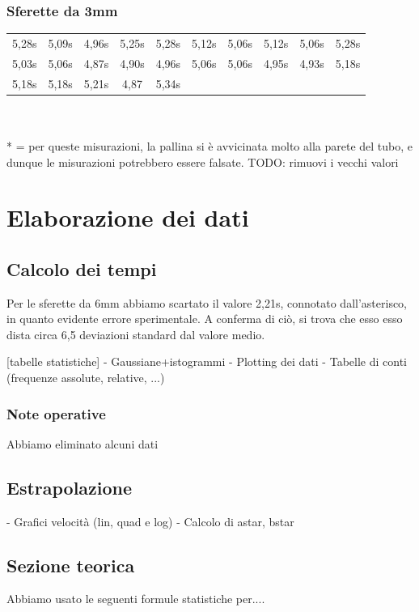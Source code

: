 \documentclass[a4paper,10pt]{report}
\begin{document}
\subsubsection{Sferette da 3mm}
\begin{tabular}{|c|c|c|c|c|c|c|c|c|c|}
\toprule
 5,28s & 5,09s & 4,96s & 5,25s & 5,28s & 5,12s & 5,06s & 5,12s & 5,06s & 5,28s \\
 5,03s & 5,06s & 4,87s & 4,90s & 4,96s & 5,06s & 5,06s & 4,95s & 4,93s & 5,18s \\
 5,18s & 5,18s & 5,21s & 4,87 & 5,34s &  &  &  &  & \\
\bottomrule
\end{tabular}
\\
\\
* = per queste misurazioni, la pallina si è avvicinata molto alla parete del tubo, e dunque le misurazioni potrebbero essere falsate.
TODO: rimuovi i vecchi valori

\section{Elaborazione dei dati}
\subsection{Calcolo dei tempi}
Per le sferette da 6mm abbiamo scartato il valore 2,21s, connotato dall'asterisco, in quanto evidente errore sperimentale. A conferma di ciò, si trova che esso esso dista circa 6,5 deviazioni standard dal valore medio.

[tabelle statistiche]
- Gaussiane+istogrammi
- Plotting dei dati
- Tabelle di conti (frequenze assolute, relative, ...)

\subsubsection{Note operative}
Abbiamo eliminato alcuni dati

\subsection{Estrapolazione}
- Grafici velocità (lin, quad e log)
- Calcolo di astar, bstar

\subsection{Sezione teorica}
Abbiamo usato le seguenti formule statistiche per....
\end{document}
